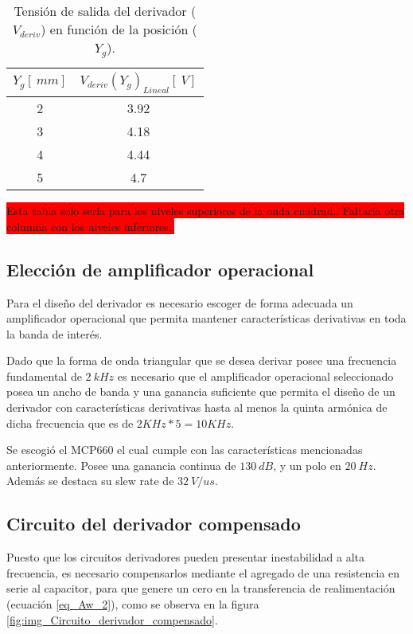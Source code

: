 \begin{table}[H]
	\begin{center}
		\begin{tabular}{| c | c |}
			\hline
			$Y_g[\:mm]$ & ${V_{deriv}(Y_g)}_{Lineal} [\:V]$\\ \hline
			2 & 3.92 \\ \hline 
			3 & 4.18 \\ \hline 
			4 & 4.44 \\ \hline 
			5 & 4.7 \\ \hline 
		\end{tabular}
		\caption{Tensión de salida del derivador ($V_{deriv}$) en función de la posición ($Y_g$).}
		\label{tab_Vyf_vs_y}
	\end{center}
\end{table}

\colorbox{red}{Esta tabla solo sería para los niveles superiores de la onda cuadrad..  Faltaría otra columna con los niveles inferiores..}

\subsection{Elección de amplificador operacional}

Para el diseño del derivador es necesario escoger de forma adecuada un amplificador operacional que permita mantener características derivativas en toda la banda de interés.

Dado que la forma de onda triangular que se desea derivar posee una frecuencia fundamental de $2 \:kHz$ es necesario que el amplificador operacional seleccionado posea un ancho de banda y una ganancia suficiente que permita el diseño de un derivador con características derivativas hasta al menos la quinta armónica de dicha frecuencia que es de $2KHz*5=10 KHz$.

Se escogió el MCP660 el cual cumple con las características mencionadas anteriormente. Posee una ganancia continua de $130\:dB$, y un polo en $20\:Hz$. Además se destaca su slew rate de $32\:V/us$.

\subsection{Circuito del derivador compensado}

Puesto que los circuitos derivadores pueden presentar inestabilidad a alta frecuencia, es necesario compensarlos mediante el agregado de una resistencia en serie al capacitor, para que genere un cero en la transferencia de realimentación (ecuación \ref{eq_Aw_2}), como se observa en la figura  \ref{fig:img_Circuito_derivador_compensado}.

